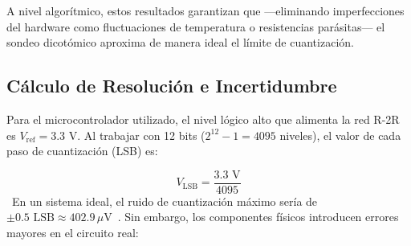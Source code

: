 \documentclass[conference]{IEEEtran}
\begin{document}
A nivel algor\'itmico, estos resultados garantizan que ---eliminando imperfecciones del hardware como fluctuaciones de temperatura o resistencias par\'asitas--- el sondeo dicot\'omico aproxima de manera ideal el l\'imite de cuantizaci\'on.


\subsection{Cálculo de Resolución e Incertidumbre}
Para el microcontrolador utilizado, el nivel lógico alto que alimenta la red R-2R es $V_{\text{ref}} = 3.3\text{ V}$. Al trabajar con 12 bits ($2^{12} - 1 = 4095$ niveles), el valor de cada paso de cuantización (LSB) es:

\begin{equation}
    V_{\text{LSB}} = \frac{3.3\text{ V}}{4095} 
\end{equation}
\,\mu{}
En un sistema ideal, el ruido de cuantización máximo sería de $\pm 0.5 \text{ LSB} \approx 402.9\,\mu\text{V}$~\cite{Fukazawa2023, Li2023}. Sin embargo, los componentes físicos introducen errores mayores en el circuito real:
\end{document}
